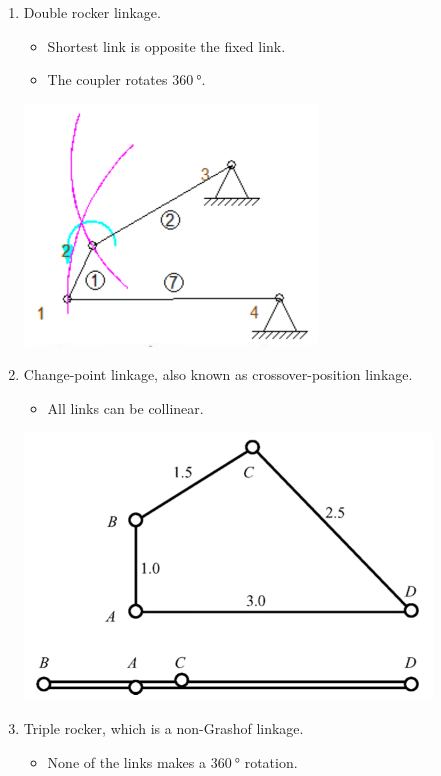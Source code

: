 \documentclass[11pt]{article}
\begin{document}
\begin{enumerate}
 \newpage

\item Double rocker linkage.
\begin{itemize}
\item Shortest link is opposite the fixed link.
\item The coupler rotates \(\qty{360}{\degree}\).
\end{itemize}

\begin{center}
\includegraphics[scale=1]{./images/double-rocker-linkage-image.png}
\end{center}

\item Change-point linkage, also known as crossover-position linkage.
\begin{itemize}
\item All links can be collinear.
\end{itemize}

\begin{center}
\includegraphics[scale=1]{./images/change-point-linkage-image.png}
\end{center}

\item Triple rocker, which is a non-Grashof linkage.
\begin{itemize}
\item None of the links makes a \(\qty{360}{\degree}\) rotation.
\end{itemize}
\end{enumerate}
\end{document}
